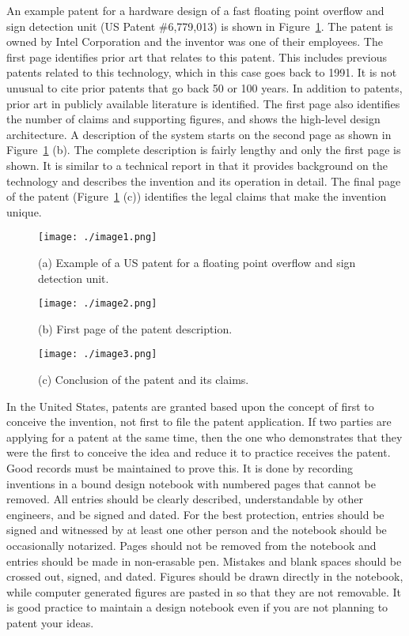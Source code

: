 An example patent for a hardware design of a fast floating point
overflow and sign detection unit (US Patent \#6,779,013) is shown in
Figure~\ref{figure:patentFloatingPoint}.
The patent is owned by Intel Corporation and the inventor
was one of their employees. The first page identifies prior art that
relates to this patent. This includes previous patents related to this
technology, which in this case goes back to 1991. It is not unusual to
cite prior patents that go back 50 or 100 years. In addition to patents,
prior art in publicly available literature is identified. The first page
also identifies the number of claims and supporting figures, and shows
the high-level design architecture. A description of the system starts
on the second page as shown in 
Figure~\ref{figure:patentFloatingPoint} (b). The complete description
is fairly lengthy and only the first page is shown. It is similar to a
technical report in that it provides background on the technology and
describes the invention and its operation in detail. The final page of
the patent (Figure~\ref{figure:patentFloatingPoint} (c)) 
identifies the legal claims that make the invention unique.

\begin{figure}
\texttt{[image: ./image1.png]}
\caption{(a) Example of a US patent for a floating point
overflow and sign detection unit.}
\label{figure:patentFloatingPoint}
\end{figure}

\begin{figure}
\texttt{[image: ./image2.png]}
\caption{(b) First page of the patent description.}
\end{figure}

\begin{figure}
\texttt{[image: ./image3.png]}
\caption{(c) Conclusion of the patent and its claims.}
\end{figure}


In the United States, patents are granted based upon the concept of
first to conceive the invention, not first to file the patent
application. If two parties are applying for a patent at the same time,
then the one who demonstrates that they were the first to conceive the
idea and reduce it to practice receives the patent. Good records must be
maintained to prove this. It is done by recording inventions in a bound
design notebook with numbered pages that cannot be removed. All entries
should be clearly described, understandable by other engineers, and be
signed and dated. For the best protection, entries should be signed and
witnessed by at least one other person and the notebook should be
occasionally notarized. Pages should not be removed from the notebook
and entries should be made in non-erasable pen. Mistakes and blank
spaces should be crossed out, signed, and dated. Figures should be drawn
directly in the notebook, while computer generated figures are pasted in
so that they are not removable. It is good practice to maintain a design
notebook even if you are not planning to patent your ideas.

